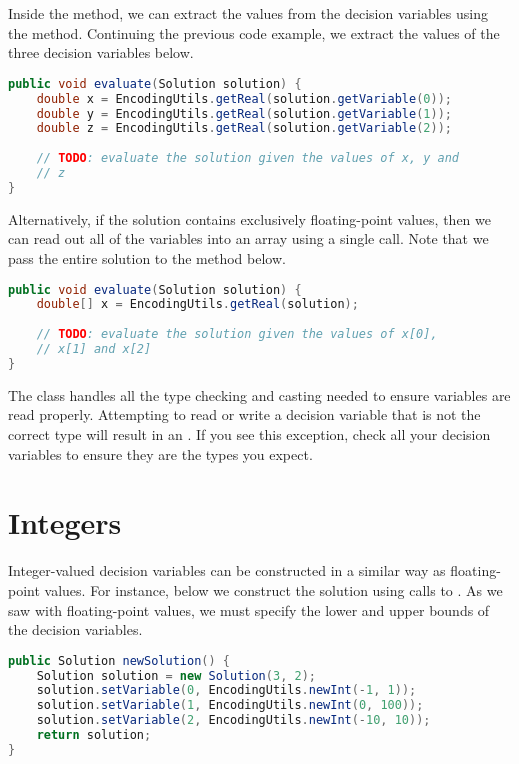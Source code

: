 Inside the  method, we can extract the values from the decision variables using the  method.  Continuing the previous code example, we extract the values of the three decision variables below.
\begin{lstlisting}[language=Java]
public void evaluate(Solution solution) {
    double x = EncodingUtils.getReal(solution.getVariable(0));
    double y = EncodingUtils.getReal(solution.getVariable(1));
    double z = EncodingUtils.getReal(solution.getVariable(2));
    
    // TODO: evaluate the solution given the values of x, y and
    // z
}
\end{lstlisting}

Alternatively, if the solution contains exclusively floating-point values, then we can read out all of the variables into an array using a single call.  Note that we pass the entire solution to the  method below.
\begin{lstlisting}[language=Java]
public void evaluate(Solution solution) {
    double[] x = EncodingUtils.getReal(solution);
        
    // TODO: evaluate the solution given the values of x[0],
    // x[1] and x[2]
}
\end{lstlisting}

The  class handles all the type checking and casting needed to ensure variables are read properly.  Attempting to read or write a decision variable that is not the correct type will result in an .  If you see this exception, check all your decision variables to ensure they are the types you expect.   

\section{Integers}

Integer-valued decision variables can be constructed in a similar way as floating-point values.  For instance, below we construct the solution using calls to .  As we saw with floating-point values, we must specify the lower and upper bounds of the decision variables.
\begin{lstlisting}[language=Java]
public Solution newSolution() {
    Solution solution = new Solution(3, 2);
    solution.setVariable(0, EncodingUtils.newInt(-1, 1));
    solution.setVariable(1, EncodingUtils.newInt(0, 100));
    solution.setVariable(2, EncodingUtils.newInt(-10, 10));
    return solution;
}
\end{lstlisting}

